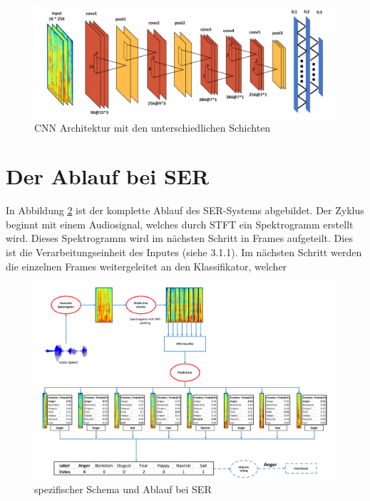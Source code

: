 \begin{figure}
    \centering
    \includegraphics[width=1\textwidth]{images/conv}
    \caption{\label{architektur}CNN Architektur mit den unterschiedlichen Schichten \cite{badshah2019deep}}
\end{figure}


\section{Der Ablauf bei SER}
In Abbildung \ref{ablauf} ist der komplette Ablauf des SER-Systems abgebildet. Der Zyklus beginnt mit einem Audiosignal, welches durch STFT ein Spektrogramm erstellt wird. Dieses Spektrogramm wird im nächsten Schritt in Frames aufgeteilt. Dies ist die Verarbeitungseinheit des Inputes (siehe 3.1.1). Im nächsten Schritt werden die einzelnen Frames weitergeleitet an den Klassifikator, welcher 
\begin{figure}[ht]
	\centering
	\includegraphics[width=1\textwidth]{images/ablauf}
	\caption{\label{ablauf}spezifischer Schema und Ablauf bei SER \cite{badshah2019deep}}
\end{figure}




